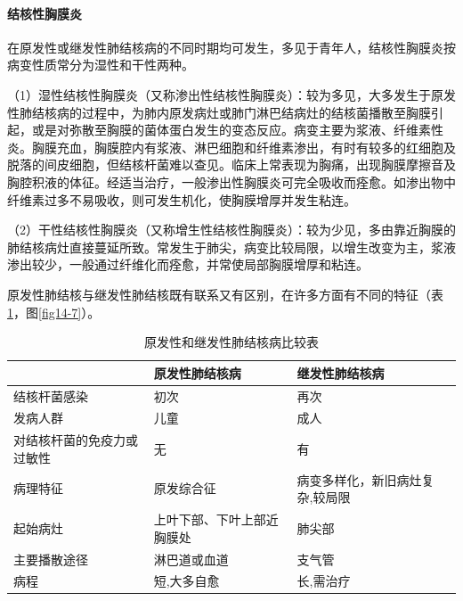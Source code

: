 \paragraph{结核性胸膜炎}
在原发性或继发性肺结核病的不同时期均可发生，多见于青年人，结核性胸膜炎按病变性质常分为湿性和干性两种。

（1）湿性结核性胸膜炎（又称渗出性结核性胸膜炎）：较为多见，大多发生于原发性肺结核病的过程中，为肺内原发病灶或肺门淋巴结病灶的结核菌播散至胸膜引起，或是对弥散至胸膜的菌体蛋白发生的变态反应。病变主要为浆液、纤维素性炎。胸膜充血，胸膜腔内有浆液、淋巴细胞和纤维素渗出，有时有较多的红细胞及脱落的间皮细胞，但结核杆菌难以查见。临床上常表现为胸痛，出现胸膜摩擦音及胸腔积液的体征。经适当治疗，一般渗出性胸膜炎可完全吸收而痊愈。如渗出物中纤维素过多不易吸收，则可发生机化，使胸膜增厚并发生粘连。

（2）干性结核性胸膜炎（又称增生性结核性胸膜炎）：较为少见，多由靠近胸膜的肺结核病灶直接蔓延所致。常发生于肺尖，病变比较局限，以增生改变为主，浆液渗出较少，一般通过纤维化而痊愈，并常使局部胸膜增厚和粘连。

原发性肺结核与继发性肺结核既有联系又有区别，在许多方面有不同的特征（表\ref{tab14-2}，图\ref{fig14-7}）。

\begin{table}[ht]
	\caption{原发性和继发性肺结核病比较表}
	\label{tab14-2}
	\centering
	\begin{tabular}{lll}
	\toprule
	&原发性肺结核病&继发性肺结核病\\
	\midrule
	结核杆菌感染&初次&再次\\
发病人群&儿童&成人\\
对结核杆菌的免疫力或过敏性&无&有\\
病理特征&原发综合征&病变多样化，新旧病灶复杂,较局限\\
起始病灶&上叶下部、下叶上部近胸膜处&肺尖部\\
主要播散途径&淋巴道或血道&支气管\\
病程&短,大多自愈&长,需治疗\\
	\bottomrule
	\end{tabular}
\end{table}




